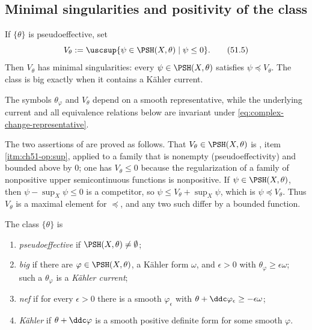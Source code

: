 \subsection{Minimal singularities and positivity of the class}
\label{sec:ch51-minimal}

\begin{definition}
\label{def:complex-minimal-potential}
If $\{\theta\}$ is pseudoeffective, set
\[
 V_\theta
 :=\uscsup\{\psi\in\PSH(X,\theta)\mid \psi\leq0\}.
\tag{51.5}\label{eq:complex-vtheta}
\]
Then $V_\theta$ has minimal singularities: every
$\psi\in\PSH(X,\theta)$ satisfies $\psi\preceq V_\theta$.
The class is big exactly when it contains a K\"ahler current.
\end{definition}

\begin{remark}\label{rem:ch51-convention-checkpoint}
The symbols $\theta_\varphi$ and $V_\theta$ depend on a smooth
representative, while the underlying current and all equivalence
relations below are invariant under
\eqref{eq:complex-change-representative}.
\end{remark}

The two assertions of  are proved as
follows.  That $V_\theta\in\PSH(X,\theta)$ is
, item \cref{itm:ch51-op:sup}, applied to a
family that is nonempty (pseudoeffectivity) and bounded above by $0$; one
has $V_\theta\leq0$ because the regularization of a family of
nonpositive upper semicontinuous functions is nonpositive.  If
$\psi\in\PSH(X,\theta)$, then $\psi-\sup_X\psi\leq0$ is a competitor,
so $\psi\leq V_\theta+\sup_X\psi$, which is
$\psi\preceq V_\theta$.  Thus $V_\theta$ is a maximal element for
$\preceq$, and any two such differ by a bounded function.

\begin{definition}
\label{def:ch51-positivity}
The class $\{\theta\}$ is
\begin{enumerate}
\item \emph{pseudoeffective} if $\PSH(X,\theta)\neq\emptyset$;
\item \emph{big} if there are $\varphi\in\PSH(X,\theta)$, a K\"ahler
      form $\omega$, and $\epsilon>0$ with
      $\theta_\varphi\geq\epsilon\omega$; such a
      $\theta_\varphi$ is a \emph{K\"ahler current};
\item \emph{nef} if for every $\epsilon>0$ there is a smooth
      $\varphi_\epsilon$ with
      $\theta+\ddc\varphi_\epsilon\geq-\epsilon\omega$;
\item \emph{K\"ahler} if $\theta+\ddc\varphi$ is a smooth positive
      definite form for some smooth $\varphi$.
\end{enumerate}
\end{definition}

